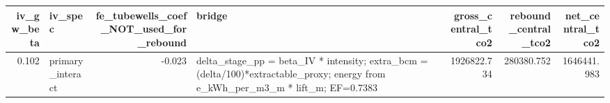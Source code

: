\begin{tabular}{rlrlrrr}
\toprule
iv_gw_beta & iv_spec & fe_tubewells_coef_NOT_used_for_rebound & bridge & gross_central_tco2 & rebound_central_tco2 & net_central_tco2 \\
\midrule
0.102 & primary_interact & -0.023 & delta_stage_pp = beta_IV * intensity; extra_bcm = (delta/100)*extractable_proxy; energy from e_kWh_per_m3_m * lift_m; EF=0.7383 & 1926822.734 & 280380.752 & 1646441.983 \\
\bottomrule
\end{tabular}
